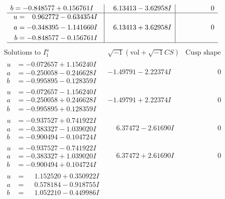 \documentclass[1p]{elsarticle_modified}
\theoremstyle{definition}
\newcommand{\I}{\sqrt{-1}}
\begin{document}
$$\begin{array}{c|c|c}
\begin{aligned}
b &= -0.848577 + 0.156761 I\end{aligned}
 & \phantom{-}6.13413 - 3.62958 I & \phantom{-0.000000 } 0 \\ \hline\begin{aligned}
u &= \phantom{-}0.962772 - 0.634354 I \\
a &= -0.348395 - 1.141660 I \\
b &= -0.848577 - 0.156761 I\end{aligned}
 & \phantom{-}6.13413 + 3.62958 I & \phantom{-0.000000 } 0\\
 \hline 
 \end{array}$$\newpage$$\begin{array}{c|c|c}  
\text{Solutions to }I^u_{1}& \I (\text{vol} + \sqrt{-1}CS) & \text{Cusp shape}\\
 \hline 
\begin{aligned}
u &= -0.072657 + 1.156240 I \\
a &= -0.250058 - 0.246628 I \\
b &= -0.995895 - 0.128359 I\end{aligned}
 & -1.49791 - 2.22374 I & \phantom{-0.000000 } 0 \\ \hline\begin{aligned}
u &= -0.072657 - 1.156240 I \\
a &= -0.250058 + 0.246628 I \\
b &= -0.995895 + 0.128359 I\end{aligned}
 & -1.49791 + 2.22374 I & \phantom{-0.000000 } 0 \\ \hline\begin{aligned}
u &= -0.937527 + 0.741922 I \\
a &= -0.383327 - 1.039020 I \\
b &= -0.900494 - 0.104724 I\end{aligned}
 & \phantom{-}6.37472 - 2.61690 I & \phantom{-0.000000 } 0 \\ \hline\begin{aligned}
u &= -0.937527 - 0.741922 I \\
a &= -0.383327 + 1.039020 I \\
b &= -0.900494 + 0.104724 I\end{aligned}
 & \phantom{-}6.37472 + 2.61690 I & \phantom{-0.000000 } 0 \\ \hline\begin{aligned}
u &= \phantom{-}1.152520 + 0.350922 I \\
a &= \phantom{-}0.578184 - 0.918755 I \\
b &= \phantom{-}1.052210 - 0.449986 I\end{aligned}

\end{array}$$
\end{document}
